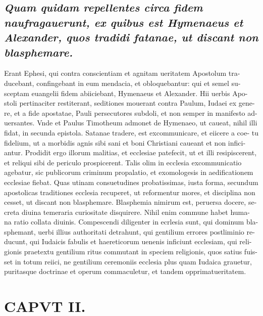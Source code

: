 \documentclass{article}
\begin{document}
\begin{pages}
\subsection*{\textit{Quam quidam repellentes circa fidem naufragauerunt, ex quibus est Hymenaeus et Alexander, quos tradidi fatanae, ut discant non blasphemare. }}\pstart Erant Ephesi, qui contra conscientiam et agnitam ueritatem Apostolum tra- ducebant, confingebant in eum mendacia, et obloquebantur: qui et semel su- sceptam euangelii fidem abiiciebant, Hymenaeus et Alexander. Hii uerbis Apo- stoli pertinaciter restiterant, seditiones mouerant contra Paulum, Iudaei ex gene- re, et a fide apostatae, Pauli persecutores subdoli, et non semper in manifesto ad- uersantes. Vnde et Paulus Timotheum admonet de Hymenaeo, ut caueat, nihil illi fidat, in secunda epistola. Satanae tradere, est excommunicare, et eiicere a coe- tu fidelium, ut a morbidis agnis sibi sani et boni Christiani caueant et non infici- antur. Prodidit ergo illorum malitias, et ecclesiae patefecit, ut et illi resipiscerent, et reliqui sibi de periculo prospicerent. Talis olim in ecclesia excommunicatio agebatur, sic publicorum criminum propalatio, et exomologesis in aedificationem ecclesiae fiebat. Quas utinam consuetudines probatissimas, iusta forma, secundum apostolicas traditiones ecclesia recuperet, ut reformentur mores, et disciplina non cesset, ut discant non blasphemare. Blasphemia nimirum est, peruersa docere, se- creta diuina temeraria curiositate disquirere. Nihil enim commune habet huma- na ratio collata diuinis. Compescendi diligenter in ecrlesia sunt, qui dominum bla- sphemant, uerbi illius authoritati detrahunt, qui gentilium errores postliminio re- ducunt, qui Iudaicis fabulis et haereticorum uenenis inficiunt ecclesiam, qui reli- gionis praetextu gentilium ritus commutant in speciem religionis, quos satius fuis- set in totum reiici, ne gentilium ceremoniis ecclesia plus quam Iudaica grauetur, puritasque doctrinae et operum commaculetur, et tandem opprimatueritatem.  \pend
\endnumbering\beginnumbering\section{CAPVT II.}
{}

\end{pages}
\end{document}

